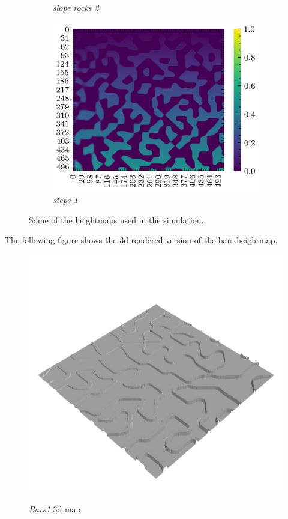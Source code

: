 \documentclass[../document.tex]{subfiles}
\begin{document}
\begin{figure} [htbp]
\begin{subfigure}[b]{0.3\textwidth}
			\caption{\emph{slope rocks 2}}
	    \end{subfigure}	
	   \begin{subfigure}[b]{0.3\textwidth}
			\includegraphics[width=\textwidth]{../img/hm/steps1.png}
			\caption{\emph{steps 1}}
	    \end{subfigure}	
	\label{fig: heightmaps}
	\caption{Some of the heightmaps used in the simulation.}	
\end{figure}
The following figure shows the 3d rendered version of the bars heightmap.
\begin{figure} [htbp]
    \includegraphics[width=\textwidth]{../img/hm3d/bars1.png}
	\label{fig: bars1-3d}
	\caption{\emph{Bars1} 3d map}
\end{figure}
\end{document}
